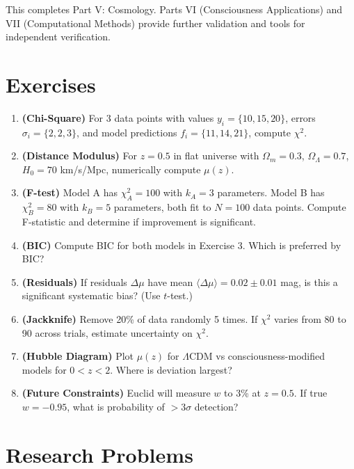 This completes Part V: Cosmology. Parts VI (Consciousness Applications) and VII (Computational Methods) provide further validation and tools for independent verification.

\section*{Exercises}

\begin{enumerate}
\item \textbf{(Chi-Square)} For 3 data points with values $y_i = \{10, 15, 20\}$, errors $\sigma_i = \{2, 2, 3\}$, and model predictions $f_i = \{11, 14, 21\}$, compute $\chi^2$.

\item \textbf{(Distance Modulus)} For $z = 0.5$ in flat universe with $\Omega_m = 0.3$, $\Omega_\Lambda = 0.7$, $H_0 = 70$ km/s/Mpc, numerically compute $\mu(z)$.

\item \textbf{(F-test)} Model A has $\chi^2_A = 100$ with $k_A = 3$ parameters. Model B has $\chi^2_B = 80$ with $k_B = 5$ parameters, both fit to $N = 100$ data points. Compute F-statistic and determine if improvement is significant.

\item \textbf{(BIC)} Compute BIC for both models in Exercise 3. Which is preferred by BIC?

\item \textbf{(Residuals)} If residuals $\Delta \mu$ have mean $\langle \Delta \mu \rangle = 0.02 \pm 0.01$ mag, is this a significant systematic bias? (Use $t$-test.)

\item \textbf{(Jackknife)} Remove 20\% of data randomly 5 times. If $\chi^2$ varies from 80 to 90 across trials, estimate uncertainty on $\chi^2$.

\item \textbf{(Hubble Diagram)} Plot $\mu(z)$ for $\Lambda$CDM vs consciousness-modified models for $0 < z < 2$. Where is deviation largest?

\item \textbf{(Future Constraints)} Euclid will measure $w$ to 3\% at $z = 0.5$. If true $w = -0.95$, what is probability of $> 3\sigma$ detection?
\end{enumerate}

\section*{Research Problems}

